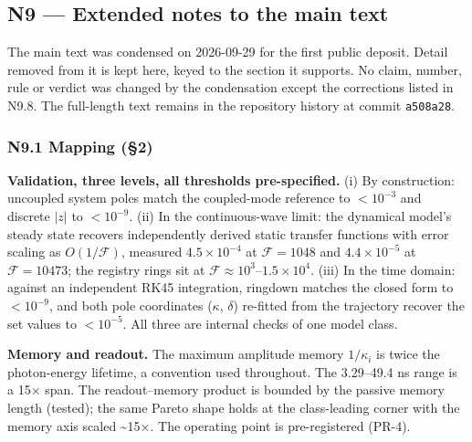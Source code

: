 \documentclass[
  10pt,
]{article}
\begin{document}
\subsection{N9 --- Extended notes to the main
text}\label{n9-extended-notes-to-the-main-text}

The main text was condensed on 2026-09-29 for the first public deposit.
Detail removed from it is kept here, keyed to the section it supports.
No claim, number, rule or verdict was changed by the condensation except
the corrections listed in N9.8. The full-length text remains in the
repository history at commit \texttt{a508a28}.

\subsubsection{N9.1 Mapping (§2)}\label{n9.1-mapping-2}

\textbf{Validation, three levels, all thresholds pre-specified.} (i) By
construction: uncoupled system poles match the coupled-mode reference to
\(<10^{-3}\) and discrete \(|z|\) to \(<10^{-9}\). (ii) In the
continuous-wave limit: the dynamical model's steady state recovers
independently derived static transfer functions with error scaling as
\(O(1/\mathcal{F})\), measured \(4.5\times10^{-4}\) at
\(\mathcal{F} = 1048\) and \(4.4\times10^{-5}\) at
\(\mathcal{F} = 10473\); the registry rings sit at
\(\mathcal{F} \approx 10^3\)--\(1.5\times10^4\). (iii) In the time
domain: against an independent RK45 integration, ringdown matches the
closed form to \(<10^{-9}\), and both pole coordinates (\(\kappa\),
\(\delta\)) re-fitted from the trajectory recover the set values to
\(<10^{-5}\). All three are internal checks of one model class.

\textbf{Memory and readout.} The maximum amplitude memory \(1/\kappa_i\)
is twice the photon-energy lifetime, a convention used throughout. The
3.29--49.4 ns range is a 15× span. The readout--memory product is
bounded by the passive memory length (tested); the same Pareto shape
holds at the class-leading corner with the memory axis scaled
\textasciitilde15×. The operating point is pre-registered (PR-4).
\end{document}
